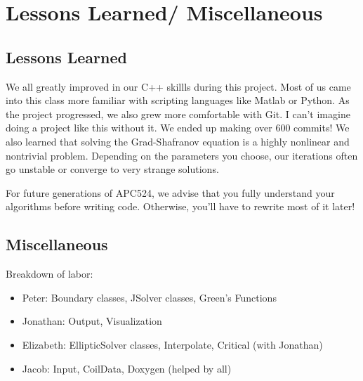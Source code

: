 \documentclass[paper=letter, fontsize=11pt]{scrartcl} %
\begin{document}

\section{Lessons Learned/ Miscellaneous}
\subsection{Lessons Learned}

We all greatly improved in our C++ skillls during this project.  Most of us came into this class more familiar with scripting languages like Matlab or Python.  As the project progressed, we also grew more comfortable with Git.  I can't imagine doing a project like this without it.  We ended up making over 600 commits!  We also learned that solving the Grad-Shafranov equation is a highly nonlinear and nontrivial problem.  Depending on the parameters you choose, our iterations often go unstable or converge to very strange solutions.  

For future generations of APC524, we advise that you fully understand your algorithms before writing code.  Otherwise, you'll have to rewrite most of it later!  

\subsection{Miscellaneous}
Breakdown of labor:

\begin{itemize}
\item Peter: Boundary classes, JSolver classes, Green's Functions
\item Jonathan: Output, Visualization 
\item Elizabeth: EllipticSolver classes, Interpolate, Critical (with Jonathan)
\item Jacob: Input, CoilData, Doxygen (helped by all)
\end{itemize}
\end{document}
